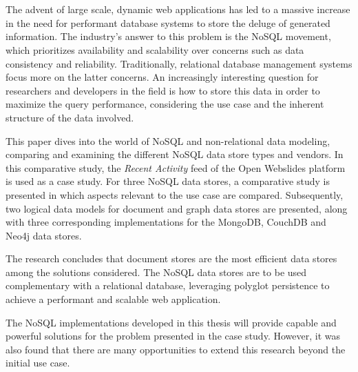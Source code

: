 \chapter*{}

The advent of large scale, dynamic web applications has led to a massive increase in the need for performant database systems to store the deluge of generated information.
The industry's answer to this problem is the NoSQL movement, which prioritizes availability and scalability over concerns such as data consistency and reliability.
Traditionally, relational database management systems focus more on the latter concerns.
An increasingly interesting question for researchers and developers in the field is how to store this data in order to maximize the query performance, considering the use case and the inherent structure of the data involved.

This paper dives into the world of NoSQL and non-relational data modeling, comparing and examining the different NoSQL data store types and vendors.
In this comparative study, the \textit{Recent Activity} feed of the Open Webslides platform is used as a case study.
For three NoSQL data stores, a comparative study is presented in which aspects relevant to the use case are compared.
Subsequently, two logical data models for document and graph data stores are presented, along with three corresponding implementations for the MongoDB, CouchDB and Neo4j data stores.

The research concludes that document stores are the most efficient data stores among the solutions considered.
The NoSQL data stores are to be used complementary with a relational database, leveraging polyglot persistence to achieve a performant and scalable web application.

The NoSQL implementations developed in this thesis will provide capable and powerful solutions for the problem presented in the case study.
However, it was also found that there are many opportunities to extend this research beyond the initial use case.
